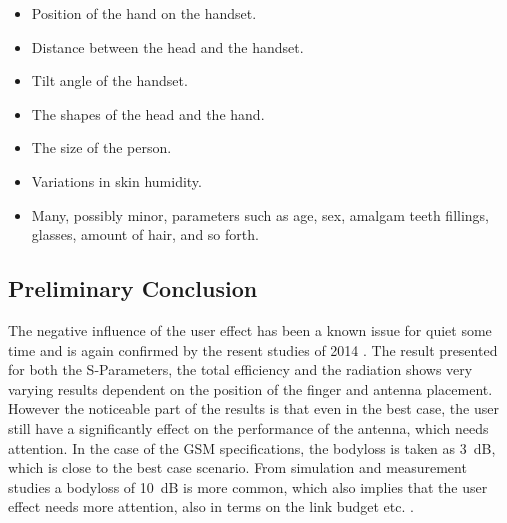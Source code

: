 \begin{itemize}
\item Position of the hand on the handset.
\item Distance between the head and the handset.
\item Tilt angle of the handset.
\item The shapes of the head and the hand.
\item The size of the person.
\item Variations in skin humidity.
\item Many, possibly minor, parameters such as age, sex, amalgam teeth fillings,
glasses, amount of hair, and so forth.
\end{itemize}

\subsection{Preliminary Conclusion}
The negative influence of the user effect has been a known issue for quiet some time and is again confirmed by the resent studies of 2014 \cite{Samantha2014UserEff}. The result presented for both the S-Parameters, the total efficiency and the radiation shows very varying results dependent on the position of the finger and antenna placement. However the noticeable part of the results is that even in the best case, the user still have a significantly effect on the performance of the antenna, which needs attention. In the case of the GSM specifications, the bodyloss is taken as \SI{3}{dB}, which is close to the best case scenario. From simulation and measurement studies a bodyloss of \SI{10}{dB} is more common, which also implies that the user effect needs more attention, also in terms on the link budget etc. \cite{sanchez2008multiband}.